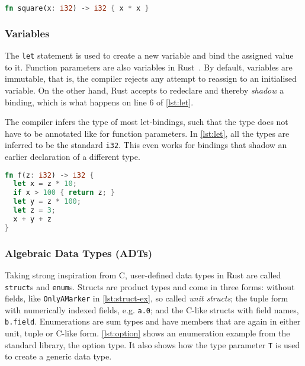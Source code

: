 \begin{lstlisting}[style=short, language=Rust, caption={A simple Rust function.}, label=lst:first-ex]
fn square(x: i32) -> i32 { x * x }
\end{lstlisting}

\subsubsection{Variables}

The \lstinline!let! statement is used to create a new variable and bind the
assigned value to it. Function parameters are also variables in
Rust~\cite{rustref}. By default, variables are immutable, that is, the compiler
rejects any attempt to reassign to an initialised variable. On the other hand,
Rust accepts to redeclare and thereby \emph{shadow} a binding, which is what
happens on line 6 of \autoref{lst:let}.

The compiler infers the type of most let-bindings, such that the type does not
have to be annotated like for function parameters. In \autoref{lst:let}, all the
types are inferred to be the standard \lstinline!i32!. This even works for
bindings that shadow an earlier declaration of a different type.

\begin{lstlisting}[language=Rust, caption={A Rust function doing some arithmetics.}, label=lst:let]
fn f(z: i32) -> i32 {
  let x = z * 10;
  if x > 100 { return z; }
  let y = z * 100;
  let z = 3;
  x + y + z
}
\end{lstlisting}

\subsubsection{Algebraic Data Types (ADTs)}

Taking strong inspiration from C, user-defined data types in Rust are called
\lstinline!struct!s and \lstinline!enum!s. Structs are product types and come in
three forms: without fields, like \lstinline!OnlyAMarker! in
\autoref{lst:struct-ex}, so called \emph{unit structs}; the tuple form with
numerically indexed fields, e.g. \lstinline!a.0!; and the C-like structs with
field names, \lstinline!b.field!. Enumerations are sum types and have members
that are again in either unit, tuple or C-like form. \autoref{lst:option} shows
an enumeration example from the standard library, the option type. It also shows
how the type parameter \lstinline!T! is used to create a generic data type.

